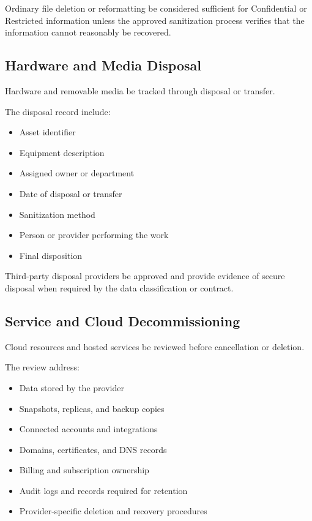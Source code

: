 Ordinary file deletion or reformatting \mustnot{} be considered sufficient for Confidential or Restricted information unless the approved sanitization process verifies that the information cannot reasonably be recovered.

\subsection{Hardware and Media Disposal}

Hardware and removable media \must{} be tracked through disposal or transfer.

The disposal record \should{} include:
\begin{itemize}
    \item Asset identifier
    \item Equipment description
    \item Assigned owner or department
    \item Date of disposal or transfer
    \item Sanitization method
    \item Person or provider performing the work
    \item Final disposition
\end{itemize}

Third-party disposal providers \must{} be approved and \should{} provide evidence of secure disposal when required by the data classification or contract.

\subsection{Service and Cloud Decommissioning}

Cloud resources and hosted services \must{} be reviewed before cancellation or deletion.

The review \must{} address:
\begin{itemize}
    \item Data stored by the provider
    \item Snapshots, replicas, and backup copies
    \item Connected accounts and integrations
    \item Domains, certificates, and DNS records
    \item Billing and subscription ownership
    \item Audit logs and records required for retention
    \item Provider-specific deletion and recovery procedures
\end{itemize}

